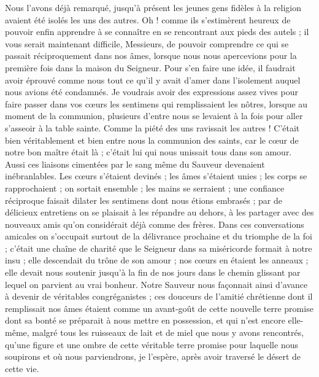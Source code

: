 Nous l'avons déjà remarqué, jusqu'à présent les jeunes gens fidèles à la religion avaient été isolés les uns des autres. Oh ! comme ils s'estimèrent heureux de pouvoir enfin apprendre à se connaître en se rencontrant aux pieds des autels ; il vous serait maintenant difficile, Messieurs, de pouvoir comprendre ce qui se passait réciproquement dans nos âmes, lorsque nous nous apercevions pour la première fois dans la maison du Seigneur. Pour s'en faire une idée, il faudrait avoir
éprouvé comme nous tout ce qu'il y avait d'amer dans l'isolement auquel nous avions été condamnés. Je voudrais avoir des expressions assez vives pour faire passer dans vos cœurs les sentimens qui remplissaient les nôtres, lorsque au moment de la communion, plusieurs d'entre nous se levaient à la fois pour aller s'asseoir à la table sainte. Comme la piété des uns ravissait les autres ! C'était bien véritablement et bien entre nous la communion des saints, car le cœur de notre bon maître était là ; c'était lui qui nous unissait tous dans son amour. Aussi ces liaisons cimentées par le sang même du Sauveur devenaient inébranlables. Les cœurs s'étaient devinés ; les âmes s'étaient unies ; les corps se rapprochaient ; on sortait ensemble ; les mains se serraient ; une confiance réciproque faisait dilater les sentimens dont nous étions embrasés ; par de délicieux entretiens on se plaisait à les répandre au dehors, à les partager avec des nouveaux amis qu'on considérait déjà comme des frères. Dans ces conversations amicales on s'occupait surtout de la délivrance prochaine et du triomphe de la foi ; c'était une chaîne de charité que le Seigneur dans sa miséricorde formait à notre insu ; elle descendait du trône de son amour ; nos cœurs en étaient les anneaux ; elle devait nous soutenir jusqu'à la fin de nos jours dans le chemin glissant par lequel on parvient au vrai bonheur. Notre Sauveur nous façonnait ainsi
d'avance à devenir de véritables congréganistes ; ces douceurs de l'amitié chrétienne dont il remplissait nos âmes étaient comme un avant-goût de cette nouvelle terre promise dont sa bonté se préparait à nous mettre en possession, et qui n'est encore elle-même, malgré tous les ruisseaux de lait et de miel que nous y avons rencontrés, qu'une figure et une ombre de cette véritable terre promise pour laquelle nous soupirons et où nous parviendrons, je l'espère, après avoir traversé le désert de cette vie.

